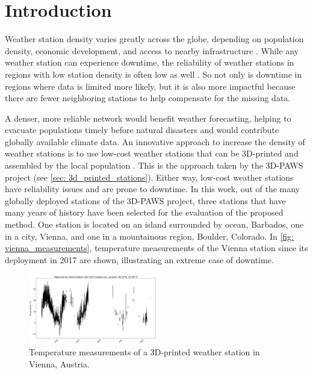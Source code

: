 \section{Introduction}
\label{sec: introduction}


Weather station density varies greatly across the globe, depending on population density, economic development, and access to nearby infrastructure \cite{ortizbobea2021}.
While any weather station can experience downtime, the reliability of weather stations in regions with low station density is often low as well \cite{Mistry2022GlobalWS}.
So not only is downtime in regions where data is limited more likely, but it is also more impactful because there are fewer neighboring stations to help compensate for the missing data.

A denser, more reliable network would benefit weather forecasting, helping to evacuate populations timely before natural disasters \cite{muita2021} and would contribute globally available climate data.
An innovative approach to increase the density of weather stations is to use low-cost weather stations that can be 3D-printed and assembled by the local population \cite{muita2021}. This is the approach taken by the 3D-PAWS project (see \autoref{sec: 3d_printed_stations}).
Either way, low-cost weather stations have reliability issues and are prone to downtime.
In this work, out of the many globally deployed stations of the 3D-PAWS project, three stations that have many years of history have been selected for the evaluation of the proposed method.
One station is located on an island surrounded by ocean, Barbados, one in a city, Vienna, and one in a mountainous region, Boulder, Colorado. In \autoref{fig: vienna_measurements}, temperature measurements of the Vienna station since its deployment in 2017 are shown, illustrating an extreme case of downtime.

\begin{figure}[H]
    \centering
    \includegraphics[width=0.5\textwidth]{resources/images/charts/vienna_available_measurements_bw.png}
    \caption{Temperature measurements of a 3D-printed weather station in Vienna, Austria.}
    \label{fig: vienna_measurements}
\end{figure}

